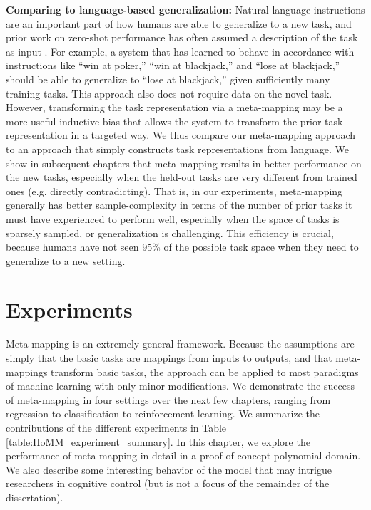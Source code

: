 \textbf{Comparing to language-based generalization:} Natural language instructions are an important part of how humans are able to generalize to a new task, and prior work on zero-shot performance has often assumed a description of the task as input \citep[e.g.]{Larochelle2008}. For example, a system that has learned to behave in accordance with instructions like ``win at poker,'' ``win at blackjack,'' and ``lose at blackjack,'' should be able to generalize to ``lose at blackjack,'' given sufficiently many training tasks. This approach also does not require data on the novel task. However, transforming the task representation via a meta-mapping may be a more useful inductive bias that allows the system to transform the prior task representation in a targeted way. We thus compare our meta-mapping approach to an approach that simply constructs task representations from language. We show in subsequent chapters that meta-mapping results in better performance on the new tasks, especially when the held-out tasks are very different from trained ones (e.g. directly contradicting). That is, in our experiments, meta-mapping generally has better sample-complexity in terms of the number of prior tasks it must have experienced to perform well, especially when the space of tasks is sparsely sampled, or generalization is challenging. This efficiency is crucial, because humans have not seen 95\% of the possible task space when they need to generalize to a new setting.

\section{Experiments}

Meta-mapping is an extremely general framework. Because the assumptions are simply that the basic tasks are mappings from inputs to outputs, and that meta-mappings transform basic tasks, the approach can be applied to most paradigms of machine-learning with only minor modifications. We demonstrate the success of meta-mapping in four settings over the next few chapters, ranging from regression to classification to reinforcement learning. We summarize the contributions of the different experiments in Table \ref{table:HoMM_experiment_summary}. In this chapter, we explore the performance of meta-mapping in detail in a proof-of-concept polynomial domain. We also describe some interesting behavior of the model that may intrigue researchers in cognitive control (but is not a focus of the remainder of the dissertation). 

